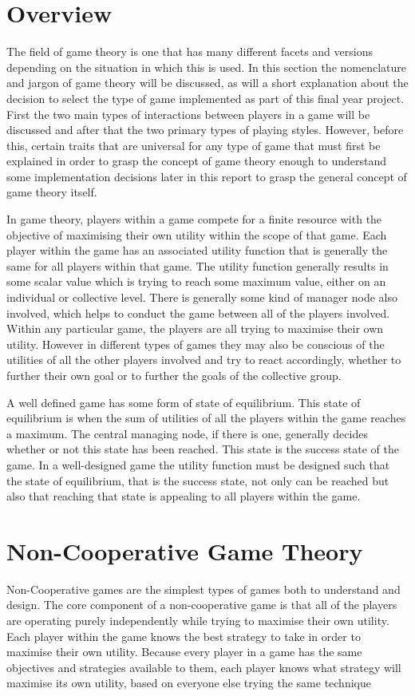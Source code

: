\documentclass[a4paper, notitlepage]{report}
\begin{document}
\section{Overview}
\label{sec:org6a13b40}
The field of game theory is one that has many different facets and versions
depending on the situation in which this is used. In this section the
nomenclature and jargon of game theory will be discussed, as will a short
explanation about the decision to select the type of game implemented as part of
this final year project. First the two main types of interactions between
players in a game will be discussed and after that the two primary types of
playing styles. However, before this, certain traits that are universal for any
type of game that must first be explained in order to grasp the concept of game
theory enough to understand some implementation decisions later in this report
to grasp the general concept of game theory itself.

In game theory, players within a game compete for a finite resource with the
objective of maximising their own utility within the scope of that game. Each
player within the game has an associated utility function that is generally the
same for all players within that game. The utility function generally results in
some scalar value which is trying to reach some maximum value, either on an
individual or collective level. There is generally some kind of manager node
also involved, which helps to conduct the game between all of the players
involved. Within any particular game, the players are all trying to maximise
their own utility. However in different types of games they may also be
conscious of the utilities of all the other players involved and try to react
accordingly, whether to further their own goal or to further the goals of the
collective group.

A well defined game has some form of state of equilibrium. This state of
equilibrium is when the sum of utilities of all the players within the game
reaches a maximum. The central managing node, if there is one, generally decides
whether or not this state has been reached. This state is the success state of
the game. In a well-designed game the utility function must be designed such
that the state of equilibrium, that is the success state, not only can be
reached but also that reaching that state is appealing to all players within the
game.
\section{Non-Cooperative Game Theory}
\label{sec:orgc8c2959}
Non-Cooperative games are the simplest types of games both to understand and
design. The core component of a non-cooperative game is that all of the players
are operating purely independently while trying to maximise their own utility.
Each player within the game knows the best strategy to take in order to maximise
their own utility. Because every player in a game has the same objectives and
strategies available to them, each player knows what strategy will maximise its
own utility, based on everyone else trying the same technique
\end{document}
